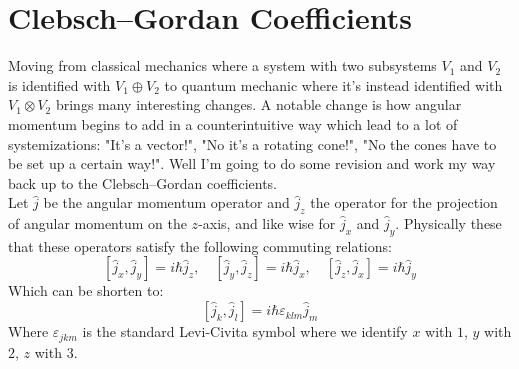 
\section{Clebsch–Gordan Coefficients}
Moving from classical mechanics where a system with two subsystems $V_1$ and $V_2$ is identified with $V_1\oplus V_2$ to quantum mechanic where it's instead identified with $V_1\otimes V_2$ brings many interesting changes.
A notable change is how angular momentum begins to add in a counterintuitive way which lead to a lot of systemizations:
"It's a vector!", "No it's a rotating cone!", "No the cones have to be set up a certain way!".
Well I'm going to do some revision and work my way back up to the Clebsch–Gordan coefficients.
\\

Let $\hat{j}$ be the angular momentum operator and $\hat{j}_z$ the operator for the projection of angular momentum on the $z$-axis, and like wise for $\hat{j}_x$ and $\hat{j}_y$.
Physically these that these operators satisfy the following commuting relations:
\[[\hat{j}_x,\hat{j}_y]=i\hbar\hat{j}_z,\quad
[\hat{j}_y,\hat{j}_z]=i\hbar\hat{j}_x,\quad
[\hat{j}_z,\hat{j}_x]=i\hbar\hat{j}_y\]
Which can be shorten to:
\[[\hat{j}_k,\hat{j}_l]=i\hbar\varepsilon_{klm}\hat{j}_m\]
Where $\varepsilon_{jkm}$ is the standard Levi-Civita symbol where we identify $x$ with $1$, $y$ with $2$, $z$ with $3$.
\\

